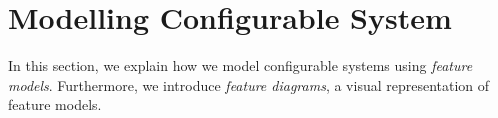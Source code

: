 \section{Modelling Configurable System}\label{ch:modelling-configsys}

In this section, we explain how we model configurable systems using \emph{feature models}. 
Furthermore, we introduce \emph{feature diagrams}, a visual representation of feature models.


